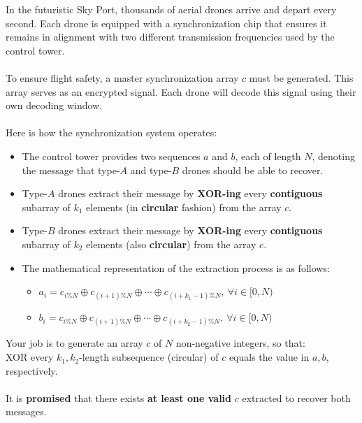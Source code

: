 \documentclass[12pt,a4paper]{article}
\begin{document}
\noindent
In the futuristic Sky Port, thousands of aerial drones arrive and depart every second. Each drone is equipped with a synchronization chip that ensures it remains in alignment with two different transmission frequencies used by the control tower.
\\\\
\noindent
To ensure flight safety, a master synchronization array $c$ must be generated. This array serves as an encrypted signal. Each drone will decode this signal using their own decoding window.
\\\\
\noindent
Here is how the synchronization system operates:
\begin{itemize}
    \item The control tower provides two sequences $a$ and $b$, each of length $N$, denoting the message that type-$A$ and type-$B$ drones should be able to recover.
    \item Type-$A$ drones extract their message by \textbf{XOR-ing} every \textbf{contiguous} subarray of $k_1$ elements (in \textbf{circular} fashion) from the array $c$.
    \item Type-$B$ drones extract their message by \textbf{XOR-ing} every \textbf{contiguous} subarray of $k_2$ elements (also \textbf{circular}) from the array $c$.
    \item The mathematical representation of the extraction process is as follows:\begin{itemize}
        \item $a_i = c_{i\%N} \oplus c_{(i+1)\%N} \oplus \cdots \oplus c_{(i+k_1-1)\%N},\ \forall i\in [0,N)$ \\
        \item $b_i = c_{i\%N} \oplus c_{(i+1)\%N} \oplus \cdots \oplus c_{(i+k_2-1)\%N},\ \forall i\in [0,N)$
        \end{itemize}
\end{itemize}
\noindent
Your job is to generate an array $c$ of $N$ non-negative integers, so that:
\\
\noindent
XOR every $k_1, k_2$-length subsequence (circular) of $c$ equals the value in $a,b$, respectively.
\\\\
\noindent
It is \textbf{promised} that there exists \textbf{at least one valid} $c$ extracted to recover both messages.
\end{document}
